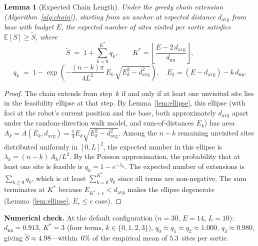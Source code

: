 \documentclass[conference]{IEEEtran}
\newtheorem{lemma}[theorem]{Lemma}
\begin{document}
\begin{lemma}[Expected Chain Length]\label{lem:chain}
Under the greedy chain extension (Algorithm~\ref{alg:chain}), starting from
an anchor at expected distance $d_{\mathrm{avg}}$ from base with budget $E$,
the expected number of sites visited per sortie satisfies
$\mathbb{E}[S] \geq \tilde{S}$, where
\begin{equation}\label{eq:stilde}
  \tilde{S} \;=\; 1 + \sum_{k=0}^{K^*} q_k, \qquad
  K^* = \left\lfloor\frac{E - 2\,d_{\mathrm{avg}}}{d_{\mathrm{nn}}}\right\rfloor,
\end{equation}
\begin{equation}\label{eq:qk}
  q_k \;=\; 1 - \exp\!\left(-\frac{(n-k)\pi}{4L^2}\,
    E_k\,\sqrt{E_k^2 - d_{\mathrm{avg}}^2}\right),
  \quad E_k = (E - d_{\mathrm{avg}}) - k\,d_{\mathrm{nn}}.
\end{equation}
\end{lemma}
\begin{proof}
The chain extends from step~$k$ if and only if at least one unvisited site
lies in the feasibility ellipse at that step.
By Lemma~\ref{lem:ellipse}, this ellipse (with foci at the robot's current
position and the base, both approximately $d_{\mathrm{avg}}$ apart under the
random-direction walk model, and sum-of-distances $E_k$) has area
$A_k = A(E_k, d_{\mathrm{avg}}) = \frac{\pi}{4}E_k\sqrt{E_k^2 - d_{\mathrm{avg}}^2}$.
Among the $n - k$ remaining unvisited sites distributed uniformly in
$[0,L]^2$, the expected number in this ellipse is
$\lambda_k = (n-k)\,A_k/L^2$.
By the Poisson approximation, the probability that at least one site is
feasible is $q_k = 1 - e^{-\lambda_k}$.
The expected number of extensions is $\sum_{k \geq 0} q_k$, which is at
least $\sum_{k=0}^{K^*} q_k$ since all terms are non-negative.
The sum terminates at $K^*$ because $E_{K^*+1} < d_{\mathrm{avg}}$ makes
the ellipse degenerate (Lemma~\ref{lem:ellipse}, $E_r \leq c$ case).
\end{proof}

\noindent\textbf{Numerical check.}
At the default configuration ($n{=}30$, $E{=}14$, $L{=}10$):
$d_{\mathrm{nn}} = 0.913$, $K^* = 3$ (four terms, $k \in \{0,1,2,3\}$),
$q_0 \approx q_1 \approx q_2 \approx 1.000$, $q_3 \approx 0.980$,
giving $\tilde{S} \approx 4.98$---within~6\% of the empirical mean of
$5.3$~sites per sortie.
\end{document}
